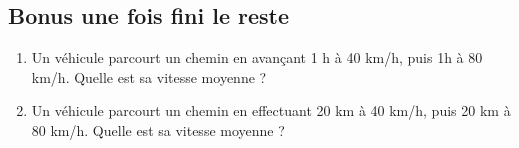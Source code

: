 \documentclass[14 pt]{extarticle}
\theoremstyle{plain}
\begin{document}
\subsection*{Bonus une fois fini le reste}
\begin{enumerate}
\item Un véhicule parcourt un chemin en avançant 1 h à 40 km/h, puis 1h à 80 km/h. Quelle est sa vitesse moyenne ? 
\item Un véhicule parcourt un chemin en effectuant 20 km à 40 km/h, puis 20 km à 80 km/h. Quelle est sa vitesse moyenne ? 
\end{enumerate}
  
 	
\end{document}
